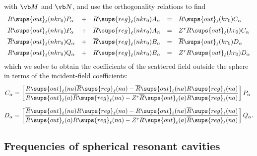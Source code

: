 \documentclass[letterpaper]{article}
\newcommand{\RBar}{\overline{R}}
\begin{document}
with $\vb M$ and $\vb N$, and use the orthogonality relations
to find
$$\begin{array}{lclcl}
  R\sups{out}_\ell(n k r_0) P_\alpha
 &+&
  R\sups{reg}_\ell(n k r_0) A_\alpha
 &=&
  R\sups{out}_\ell(k r_0) C_\alpha
\\[5pt]
  \RBar\sups{out}_\ell(n k r_0) P_\alpha
 &+&
  \RBar\sups{reg}_\ell(n k r_0) A_\alpha
 &=&
  Z^r \RBar\sups{out}_\ell(k r_0) C_\alpha
\\[5pt]
  \RBar\sups{out}_\ell(n k r_0) Q_\alpha
 &+&
  \RBar\sups{reg}_\ell(n k r_0) B_\alpha
 &=&
  \RBar\sups{out}_\ell(k r_0) D_\alpha
\\[5pt]
  R\sups{out}_\ell(n k r_0) Q_\alpha
 &+& 
  R\sups{reg}_\ell(n k r_0) B_\alpha
 &=& 
  Z^r R\sups{out}_\ell(k r_0) D_\alpha
\end{array}$$
which we solve to obtain the coefficients of the scattered
field outside the sphere in terms of the incident-field 
coefficients:
\begin{subequations}
\begin{align}
 C_\alpha 
&= \left[
   \frac{ R\sups{out}_\ell(na) \RBar\sups{reg}_\ell(na)
         -\RBar\sups{out}_\ell(na) R\sups{reg}_\ell(na)
        }
        { R\sups{out}_\ell(a) \RBar\sups{reg}_\ell(na)
         -Z^r\RBar\sups{out}_\ell(a) R\sups{reg}_\ell(na)
        }
    \right] P_\alpha
\\[5pt]
 D_\alpha 
&= \left[
   \frac{ \RBar\sups{out}_\ell(na) R\sups{reg}_\ell(na)
         -R\sups{out}_\ell(na) \RBar\sups{reg}_\ell(na)
        }
        { \RBar\sups{out}_\ell(a) R\sups{reg}_\ell(na)
         -Z^r R\sups{out}_\ell(a) \RBar\sups{reg}_\ell(na)
        }
    \right] Q_\alpha.
\end{align}
\label{CDAlpha}
\end{subequations}

\subsection{Frequencies of spherical resonant cavities}
\end{document}
